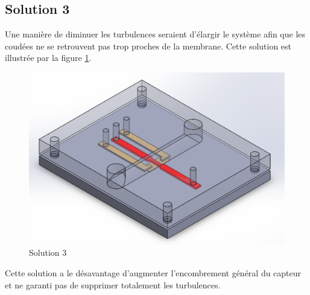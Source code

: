 \subsection{Solution 3}
Une manière de diminuer les turbulences seraient d'élargir le système afin que les coudées ne se retrouvent pas trop proches de la
membrane. Cette solution est illustrée par la figure \ref{fig:solution3}. 

\begin{figure}[H]
    \centering
    \includegraphics[scale = 0.3]{images/Design4}
    \caption{Solution 3}
    \label{fig:solution3}
\end{figure}
Cette solution a le désavantage d'augmenter l'encombrement général du capteur et ne garanti pas de supprimer totalement les turbulences. 

